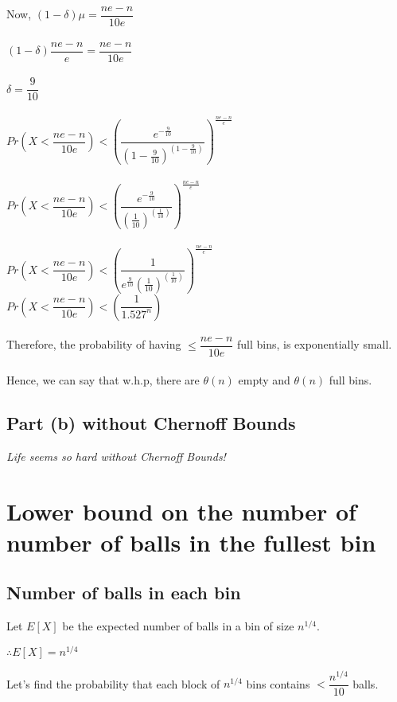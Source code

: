 \documentclass{article}
\begin{document}
Now, $(1-\delta)\mu = \dfrac{ne-n}{10e}$\\
\\
$(1-\delta)\dfrac{ne-n}{e} = \dfrac{ne-n}{10e}$\\
\\
$\delta = \dfrac{9}{10}$\\
\\
$Pr\left(X < \dfrac{ne-n}{10e}\right) < \left(\dfrac{e^{-\frac{9}{10}}}{(1-\frac{9}{10})^{(1-\frac{9}{10})}}\right)^{\frac{ne-n}{e}}$\\
\\
$Pr\left(X < \dfrac{ne-n}{10e}\right) < \left(\dfrac{e^{-\frac{9}{10}}}{(\frac{1}{10})^{(\frac{1}{10})}}\right)^{\frac{ne-n}{e}}$\\
\\
$Pr\left(X < \dfrac{ne-n}{10e}\right) < \left(\dfrac{1}{e^{\frac{9}{10}}(\frac{1}{10})^{(\frac{1}{10})}}\right)^{\frac{ne-n}{e}}$\\
$Pr\left(X < \dfrac{ne-n}{10e}\right) < \left(\dfrac{1}{1.527^{n}}\right)$\\
\\
Therefore, the probability of having $\leq \dfrac{ne-n}{10e} $ full bins, is exponentially small.\\
\\
Hence, we can say that w.h.p, there are $\theta(n)$ empty and $\theta(n)$ full bins.

\subsection{Part (b) without Chernoff Bounds}

\textit{Life seems so hard without Chernoff Bounds!}

\clearpage

\section {Lower bound on the number of number of balls in the fullest bin}

\subsection{Number of balls in each bin}

Let $E[X] $ be the expected number of balls in a bin of size $n^{1/4}$.

$\therefore E[X] = n^{1/4}$

Let's find the probability that each block of $n^{1/4}$ bins contains $< \dfrac{n^{1/4}}{10}$ balls.
\end{document}
